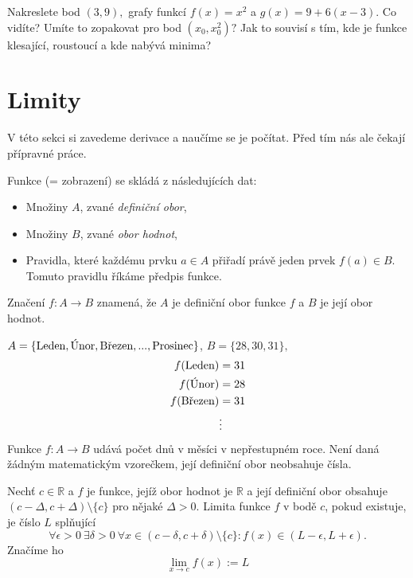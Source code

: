\begin{úloha}
Nakreslete bod $(3,9),$ grafy funkcí $f(x)=x^{2}$ a $g(x)=9+6(x-3).$ Co vidíte? Umíte to zopakovat pro bod $(x_0,x_0^{2})?$ Jak to souvisí s tím, kde je funkce klesající, roustoucí a kde nabývá minima?
\end{úloha}

\section{Limity}
V této sekci si zavedeme derivace a naučíme se je počítat. Před tím nás ale čekají přípravné práce.
\begin{definice}[Funkce] 

\leavevmode
Funkce (= zobrazení) se skládá z následujících dat:
\begin{itemize}
	\item Množiny $A$, zvané \emph{definiční obor},
	\item Množiny $B$, zvané \emph{obor hodnot},
	\item Pravidla, které každému prvku $a\in A$ přiřadí právě jeden prvek $f(a)\in B$. Tomuto pravidlu říkáme předpis funkce.
\end{itemize}
Značení $f\colon A\to B$ znamená, že $A$ je definiční obor funkce $f$ a $B$ je její obor hodnot.
\end{definice}
\newcommand{\Leden}{\textnormal{Leden}}
\newcommand{\Unor}{\textnormal{Únor}}
\newcommand{\Brezen}{\textnormal{Březen}}
\newcommand{\Prosinec}{\textnormal{Prosinec}}
\begin{příklad}
	$A=\{\Leden, \Unor, \Brezen, ..., \Prosinec\}$, $B=\{28,30,31\},$
	\begin{align*}
		f(\Leden)&=31 \\
		f(\Unor)&=28 \\
		f(\Brezen)&=31 \\
			 &\vdots
	\end{align*}
Funkce $f\colon A\to B$ udává počet dnů v měsíci v nepřestupném roce. Není daná žádným matematickým vzorečkem, její definiční obor neobsahuje čísla.
\end{příklad}

\begin{definice} \label{def:Limita funkce}
	Nechť $c\in \mathbb{R}$ a $f$ je funkce, jejíž obor hodnot je $\mathbb{R}$ a její definiční obor obsahuje $(c-\Delta,c+\Delta)\setminus\{c\}$ pro nějaké $\Delta>0$. Limita funkce $f$ v bodě $c$, pokud existuje, je číslo $L$ splňující
\begin{equation*}
	\forall \epsilon>0 \ \exists \delta>0\ \forall x\in (c-\delta,c+\delta)\setminus\{c\}\colon f(x)\in(L-\epsilon, L+\epsilon).
\end{equation*}
Značíme ho
\begin{equation*}
	\lim_{x\to c}f(x):=L
\end{equation*} 
\end{definice}

